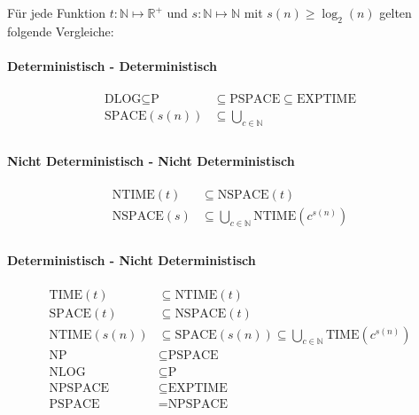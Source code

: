 \documentclass[11pt]{article}
\begin{document}
Für jede Funktion $t: \mathbb{N} \mapsto \mathbb{R}^+$ und $s: \mathbb{N} \mapsto \mathbb{N}$ mit $s(n) \geq \log_2(n)$ gelten folgende Vergleiche:

\paragraph{Deterministisch - Deterministisch}
\begin{equation*}
\begin{split}
	\text{DLOG} \subseteq \text{P} & \subseteq \text{PSPACE} \subseteq \text{EXPTIME} \\
	\text{SPACE}(s(n)) & \subseteq \bigcup_{c \in \mathbb{N}} \\
\end{split}
\end{equation*}

\paragraph{Nicht Deterministisch - Nicht Deterministisch}
\begin{equation*}
\begin{split}
	\text{NTIME}(t) & \subseteq \text{NSPACE}(t)\\
	\text{NSPACE}(s) & \subseteq \bigcup_{c \in \mathbb{N}}\text{NTIME}(c^{s(n)}) \\
\end{split}
\end{equation*}

\paragraph{Deterministisch - Nicht Deterministisch}
\begin{equation*}
\begin{split}
	\text{TIME}(t) & \subseteq \text{NTIME}(t) \\
	\text{SPACE}(t) & \subseteq \text{NSPACE}(t) \\
	\text{NTIME}(s(n)) & \subseteq \text{SPACE}(s(n)) \subseteq \bigcup_{c \in \mathbb{N}}\text{TIME}(c^{s(n)}) \\
	\text{NP} & \subseteq \text{PSPACE} \\
	\text{NLOG} & \subseteq \text{P} \\
	\text{NPSPACE} & \subseteq \text{EXPTIME} \\
	\text{PSPACE} & = \text{NPSPACE}
\end{split}
\end{equation*}
\end{document}
